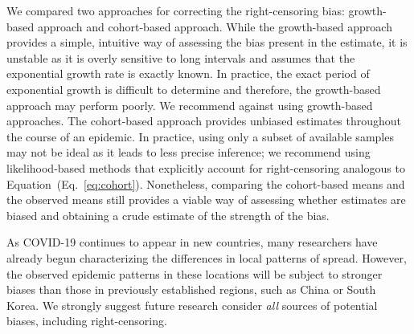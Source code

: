 \documentclass[12pt]{article}
\newcommand{\eref}[1]{(Eq.~\ref{eq:#1})}
\begin{document}
We compared two approaches for correcting the right-censoring bias: growth-based approach and cohort-based approach.
While the growth-based approach provides a simple, intuitive way of assessing the bias present in the estimate, it is unstable as it is overly sensitive to long intervals and assumes that the exponential growth rate is exactly known.
In practice, the exact period of exponential growth is difficult to determine \citep{ma2014estimating} and therefore, the growth-based approach may perform poorly.
We recommend against using growth-based approaches.
The cohort-based approach provides unbiased estimates throughout the course of an epidemic.
In practice, using only a subset of available samples may not be ideal as it leads to less precise inference;
we recommend using likelihood-based methods that explicitly account for right-censoring analogous to Equation~\eref{cohort}.
Nonetheless, comparing the cohort-based means and the observed means still provides a viable way of assessing whether estimates are biased and obtaining a crude estimate of the strength of the bias.

As COVID-19 continues to appear in new countries, many researchers have already begun characterizing the differences in local patterns of spread.
However, the observed epidemic patterns in these locations will be subject to stronger biases than those in previously established regions, such as China or South Korea.
We strongly suggest future research consider \emph{all} sources of potential biases, including right-censoring.


\end{document}
